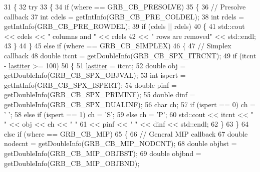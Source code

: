 \begin{DoxyCode}
31      \{
32       \textcolor{keywordflow}{try} 
33        \{
34         \textcolor{keywordflow}{if} (where == GRB\_CB\_PRESOLVE) 
35          \{
36           \textcolor{comment}{// Presolve callback}
37           \textcolor{keywordtype}{int} cdels = getIntInfo(GRB\_CB\_PRE\_COLDEL);
38           \textcolor{keywordtype}{int} rdels = getIntInfo(GRB\_CB\_PRE\_ROWDEL);
39           \textcolor{keywordflow}{if} (cdels || rdels) 
40            \{
41             std::cout << cdels << \textcolor{stringliteral}{" columns and "} << rdels
42                       << \textcolor{stringliteral}{" rows are removed"} << std::endl;
43            \}
44          \}
45         \textcolor{keywordflow}{else} \textcolor{keywordflow}{if} (where == GRB\_CB\_SIMPLEX) 
46          \{
47           \textcolor{comment}{// Simplex callback}
48           \textcolor{keywordtype}{double} itcnt = getDoubleInfo(GRB\_CB\_SPX\_ITRCNT);
49           \textcolor{keywordflow}{if} (itcnt - \hyperlink{classmyCallback_ab40235875eeddd832320ef2d06205596}{lastiter} >= 100)
50            \{
51             \hyperlink{classmyCallback_ab40235875eeddd832320ef2d06205596}{lastiter} = itcnt;
52             \textcolor{keywordtype}{double} obj = getDoubleInfo(GRB\_CB\_SPX\_OBJVAL);
53             \textcolor{keywordtype}{int} ispert = getIntInfo(GRB\_CB\_SPX\_ISPERT);
54             \textcolor{keywordtype}{double} pinf = getDoubleInfo(GRB\_CB\_SPX\_PRIMINF);
55             \textcolor{keywordtype}{double} dinf = getDoubleInfo(GRB\_CB\_SPX\_DUALINF);
56             \textcolor{keywordtype}{char} ch;
57             \textcolor{keywordflow}{if} (ispert == 0)      ch = \textcolor{charliteral}{' '};
58             \textcolor{keywordflow}{else} \textcolor{keywordflow}{if} (ispert == 1) ch = \textcolor{charliteral}{'S'};
59             \textcolor{keywordflow}{else}                  ch = \textcolor{charliteral}{'P'};
60             std::cout << itcnt << \textcolor{stringliteral}{" "} << obj << ch << \textcolor{stringliteral}{" "}
61                       << pinf << \textcolor{stringliteral}{" "} << dinf << std::endl;
62            \}
63          \}
64         \textcolor{keywordflow}{else} \textcolor{keywordflow}{if} (where == GRB\_CB\_MIP)
65          \{
66           \textcolor{comment}{// General MIP callback}
67           \textcolor{keywordtype}{double} nodecnt = getDoubleInfo(GRB\_CB\_MIP\_NODCNT);
68           \textcolor{keywordtype}{double} objbst = getDoubleInfo(GRB\_CB\_MIP\_OBJBST);
69           \textcolor{keywordtype}{double} objbnd = getDoubleInfo(GRB\_CB\_MIP\_OBJBND);

\end{DoxyCode}
